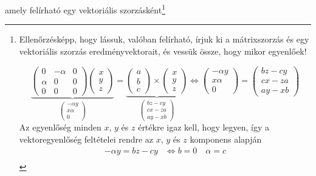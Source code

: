 \documentclass[12pt,a4paper]{scrartcl}
\begin{document}
amely felírható egy vektoriális szorzásként\footnote{Ellenőrzésképp, hogy lássuk, valóban felírható, írjuk ki a mátrixszorzás és egy vektoriális szorzás eredményvektorait, és vessük össze, hogy mikor egyenlőek!

\[\underbrace {\left( {\begin{array}{*{20}{c}}
  0&{ - \alpha }&0 \\ 
  \alpha &0&0 \\ 
  0&0&0 
\end{array}} \right)\left( {\begin{array}{*{20}{c}}
  x \\ 
  y \\ 
  z 
\end{array}} \right)}_{\left( {\begin{array}{*{20}{c}}
  { - \alpha y} \\ 
  {x\alpha } \\ 
  0 
\end{array}} \right)} = \underbrace {\left( {\begin{array}{*{20}{c}}
  a \\ 
  b \\ 
  c 
\end{array}} \right) \times \left( {\begin{array}{*{20}{c}}
  x \\ 
  y \\ 
  z 
\end{array}} \right)}_{\left( {\begin{array}{*{20}{c}}
  {bz - cy} \\ 
  {cx - za} \\ 
  {ay - xb} 
\end{array}} \right)} \Leftrightarrow \left( {\begin{array}{*{20}{c}}
  { - \alpha y} \\ 
  {x\alpha } \\ 
  0 
\end{array}} \right) = \left( {\begin{array}{*{20}{c}}
  {bz - cy} \\ 
  {cx - za} \\ 
  {ay - xb} 
\end{array}} \right)\]
Az egyenlőség minden $x$, $y$ és $z$ értékre igaz kell, hogy legyen, így a vektoregyenlőség feltételei rendre az $x$, $y$ és $z$ komponens alapján
\[\begin{aligned}
   - \alpha y = bz - cy &  \Leftrightarrow b = 0\quad \alpha  = c \\ 

\end{aligned}\]}
\end{document}
